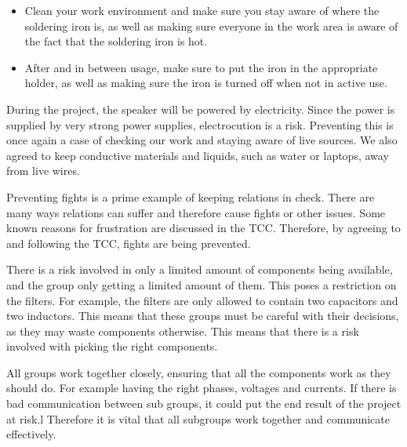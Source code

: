 \begin{itemize}
    \item Clean your work environment and make sure you stay aware of where the soldering iron is, as well as making sure everyone in the work area is aware of the fact that the soldering iron is hot.
    \item After and in between usage, make sure to put the iron in the appropriate holder, as well as making sure the iron is turned off when not in active use.
\end{itemize}

During the project, the speaker will be powered by electricity. Since the power is supplied by very strong power supplies, electrocution is a risk. Preventing this is once again a case of checking our work and staying aware of live sources. We also agreed to keep conductive materials and liquids, such as water or laptops, away from live wires.

Preventing fights is a prime example of keeping relations in check. There are many ways relations can suffer and therefore cause fights or other issues. Some known reasons for frustration are discussed in the TCC. Therefore, by agreeing to and following the TCC, fights are being prevented.

There is a risk involved in only a limited amount of components being available, and the group only getting a limited amount of them. This poses a restriction on the filters. For example, the filters are only allowed to contain two capacitors and two inductors. This means that these groups must be careful with their decisions, as they may waste components otherwise. This means that there is a risk involved with picking the right components.

All groups work together closely, ensuring that all the components work as they should do. For example having the right phases, voltages and currents. If there is bad communication between sub groups, it could put the end result of the project at risk.l Therefore it is vital that all subgroups work together and communicate effectively. 


    
	

